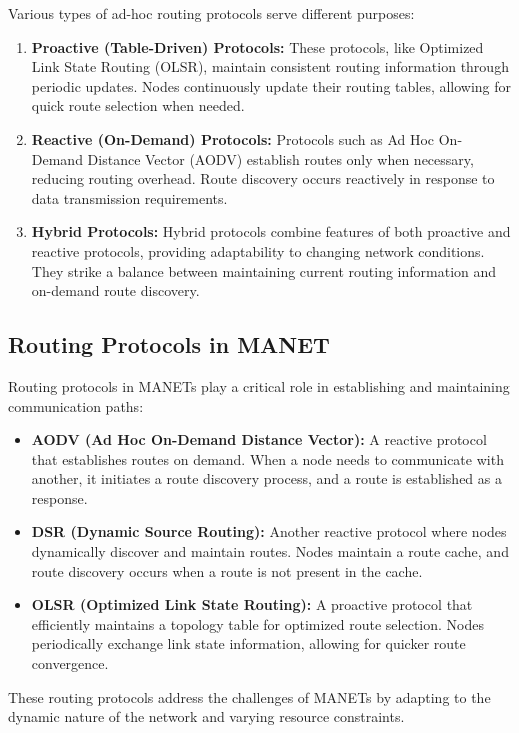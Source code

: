\documentclass[11pt]{article}
\begin{document}
Various types of ad-hoc routing protocols serve different purposes:

\begin{enumerate}
    \item \textbf{Proactive (Table-Driven) Protocols:} These protocols, like Optimized Link State Routing (OLSR), maintain consistent routing information through periodic updates. Nodes continuously update their routing tables, allowing for quick route selection when needed.
    \item \textbf{Reactive (On-Demand) Protocols:} Protocols such as Ad Hoc On-Demand Distance Vector (AODV) establish routes only when necessary, reducing routing overhead. Route discovery occurs reactively in response to data transmission requirements.
    \item \textbf{Hybrid Protocols:} Hybrid protocols combine features of both proactive and reactive protocols, providing adaptability to changing network conditions. They strike a balance between maintaining current routing information and on-demand route discovery.
\end{enumerate}

\subsection{Routing Protocols in MANET}

Routing protocols in MANETs play a critical role in establishing and maintaining communication paths:

\begin{itemize}
    \item \textbf{AODV (Ad Hoc On-Demand Distance Vector):} A reactive protocol that establishes routes on demand. When a node needs to communicate with another, it initiates a route discovery process, and a route is established as a response.
    \item \textbf{DSR (Dynamic Source Routing):} Another reactive protocol where nodes dynamically discover and maintain routes. Nodes maintain a route cache, and route discovery occurs when a route is not present in the cache.
    \item \textbf{OLSR (Optimized Link State Routing):} A proactive protocol that efficiently maintains a topology table for optimized route selection. Nodes periodically exchange link state information, allowing for quicker route convergence.
\end{itemize}

These routing protocols address the challenges of MANETs by adapting to the dynamic nature of the network and varying resource constraints.
\end{document}
